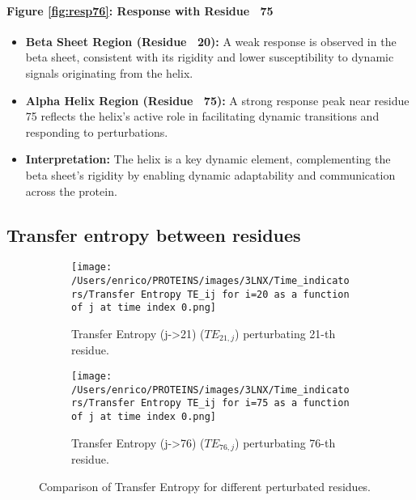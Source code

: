 \documentclass[English, Lau, oneside]{sapthesis}
\begin{document}
\paragraph{Figure \ref{fig:resp76}: Response with Residue ~75}
\begin{itemize}
    \item \textbf{Beta Sheet Region (Residue ~20):} A weak response is observed in the beta sheet, consistent with its rigidity and lower susceptibility to dynamic signals originating from the helix.
    \item \textbf{Alpha Helix Region (Residue ~75):} A strong response peak near residue 75 reflects the helix's active role in facilitating dynamic transitions and responding to perturbations.
    \item \textbf{Interpretation:} The helix is a key dynamic element, complementing the beta sheet's rigidity by enabling dynamic adaptability and communication across the protein.
\end{itemize}



\newpage
\newpage









\subsection{Transfer entropy between residues}
\begin{figure}[h!]
    \centering
    \begin{subfigure}[t]{0.48\textwidth}
        \centering
        \texttt{[image: /Users/enrico/PROTEINS/images/3LNX/Time\_indicators/Transfer Entropy TE\_ij for i=20 as a function of j at time index 0.png]}
        \caption{Transfer Entropy (j->21) ($TE_{21,j}$) perturbating 21-th residue.}
        \label{fig:TE21_i_j}
    \end{subfigure}
    \hfill
    \begin{subfigure}[t]{0.48\textwidth}
        \centering
        \texttt{[image: /Users/enrico/PROTEINS/images/3LNX/Time\_indicators/Transfer Entropy TE\_ij for i=75 as a function of j at time index 0.png]}
        \caption{Transfer Entropy (j->76) ($TE_{76,j}$) perturbating 76-th residue.}
        \label{fig:TE76_i_j}
    \end{subfigure}
    \caption{Comparison of Transfer Entropy for different perturbated residues.}
    \label{fig:TE_comparison_i_j}
\end{figure}
\end{document}
